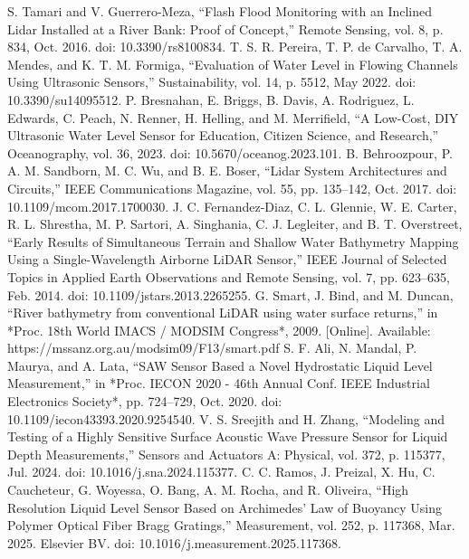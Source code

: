 \documentclass[conference]{IEEEtran}
\begin{document}
\begin{thebibliography}{00}
 S. Tamari and V. Guerrero-Meza, 
``Flash Flood Monitoring with an Inclined Lidar Installed at a River Bank: Proof of Concept,'' 
Remote Sensing, vol. 8, p. 834, Oct. 2016. doi: 10.3390/rs8100834.
 T. S. R. Pereira, T. P. de Carvalho, T. A. Mendes, and K. T. M. Formiga, 
``Evaluation of Water Level in Flowing Channels Using Ultrasonic Sensors,'' 
Sustainability, vol. 14, p. 5512, May 2022. doi: 10.3390/su14095512.
 P. Bresnahan, E. Briggs, B. Davis, A. Rodriguez, L. Edwards, C. Peach, N. Renner, H. Helling, and M. Merrifield, 
``A Low-Cost, DIY Ultrasonic Water Level Sensor for Education, Citizen Science, and Research,'' 
Oceanography, vol. 36, 2023. doi: 10.5670/oceanog.2023.101.
 B. Behroozpour, P. A. M. Sandborn, M. C. Wu, and B. E. Boser, 
``Lidar System Architectures and Circuits,'' 
IEEE Communications Magazine, vol. 55, pp. 135--142, Oct. 2017. doi: 10.1109/mcom.2017.1700030.
 J. C. Fernandez-Diaz, C. L. Glennie, W. E. Carter, R. L. Shrestha, M. P. Sartori, A. Singhania, C. J. Legleiter, and B. T. Overstreet, 
``Early Results of Simultaneous Terrain and Shallow Water Bathymetry Mapping Using a Single-Wavelength Airborne LiDAR Sensor,'' 
IEEE Journal of Selected Topics in Applied Earth Observations and Remote Sensing, vol. 7, pp. 623--635, Feb. 2014. 
doi: 10.1109/jstars.2013.2265255.
 G. Smart, J. Bind, and M. Duncan, 
``River bathymetry from conventional LiDAR using water surface returns,'' 
in *Proc. 18th World IMACS / MODSIM Congress*, 2009. [Online]. Available: https://mssanz.org.au/modsim09/F13/smart.pdf
 S. F. Ali, N. Mandal, P. Maurya, and A. Lata, 
``SAW Sensor Based a Novel Hydrostatic Liquid Level Measurement,'' 
in *Proc. IECON 2020 - 46th Annual Conf. IEEE Industrial Electronics Society*, pp. 724--729, Oct. 2020. 
doi: 10.1109/iecon43393.2020.9254540.
 V. S. Sreejith and H. Zhang, 
``Modeling and Testing of a Highly Sensitive Surface Acoustic Wave Pressure Sensor for Liquid Depth Measurements,'' 
Sensors and Actuators A: Physical, vol. 372, p. 115377, Jul. 2024. doi: 10.1016/j.sna.2024.115377.
 C. C. Ramos, J. Preizal, X. Hu, C. Caucheteur, G. Woyessa, O. Bang, A. M. Rocha, and R. Oliveira, 
``High Resolution Liquid Level Sensor Based on Archimedes’ Law of Buoyancy Using Polymer Optical Fiber Bragg Gratings,'' 
Measurement, vol. 252, p. 117368, Mar. 2025. Elsevier BV. doi: 10.1016/j.measurement.2025.117368.

\end{thebibliography}
\end{document}
